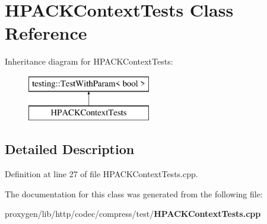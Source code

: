 \section{H\+P\+A\+C\+K\+Context\+Tests Class Reference}
\label{classHPACKContextTests}
Inheritance diagram for H\+P\+A\+C\+K\+Context\+Tests\+:\begin{figure}[H]
\begin{center}
\leavevmode
\includegraphics[height=2.000000cm]{classHPACKContextTests}
\end{center}
\end{figure}


\subsection{Detailed Description}


Definition at line 27 of file H\+P\+A\+C\+K\+Context\+Tests.\+cpp.



The documentation for this class was generated from the following file\+:\begin{DoxyCompactItemize}
\item 
proxygen/lib/http/codec/compress/test/{\bf H\+P\+A\+C\+K\+Context\+Tests.\+cpp}\end{DoxyCompactItemize}
